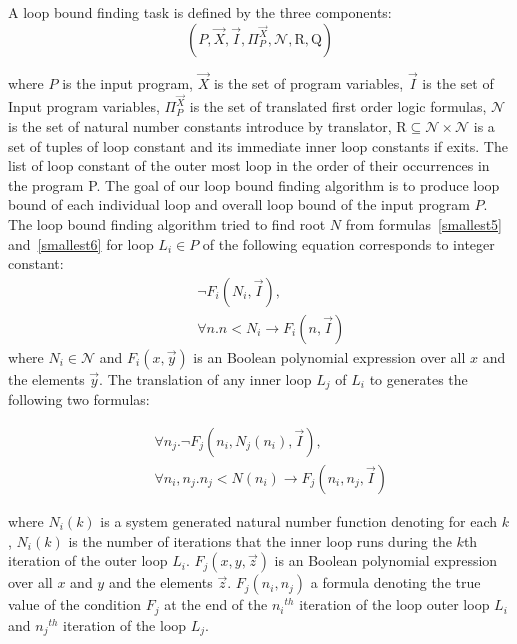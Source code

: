 \documentclass{article}
\begin{document}
A loop bound finding task is defined by the three components:
\[(P,\vec{X},\vec{I},\Pi_P^{\vec{X}},\mathcal{N},\mathrm{R},\mathrm{Q} )\]

where $P$ is the input program, $\vec{X}$ is the set of program variables,
$\vec{I}$ is the set of Input program variables, $\Pi_P^{\vec{X}}$ is the set of translated first order logic formulas, $\mathcal{N}$ is the set of natural number constants introduce by translator,  $\mathrm{R}\subseteq \mathcal{N} \times \mathcal{N}$ is a set of tuples of loop constant and its 
immediate inner loop constants if exits. The list of loop constant of the outer most loop in the order of their occurrences in the program P.
The goal of our loop bound finding algorithm is to produce loop bound of each individual loop and overall loop bound of the input program $P$. The loop bound finding algorithm tried to find root $N$ from formulas~\ref{smallest5} and~\ref{smallest6}  for loop $L_i\in P$ of the following equation corresponds to integer constant:
\begin{eqnarray}
&& \neg F_i(N_i,\vec{I}), \label{smallest7}\\
&& \forall n. n< N_i\rightarrow  F_i(n,\vec{I}) \label{smallest8}
\end{eqnarray}
where $N_i\in \mathcal{N}$ and $F_i(x,\vec{y})$ is an Boolean polynomial expression over all $x$ and the elements $\vec{y}$. The translation of any inner loop $L_j$ of $L_i$ to generates the following two formulas:

\begin{eqnarray}
&&  \forall n_j.\neg F_j(n_i,N_j(n_i),\vec{I}), \label{smallest1}\\
&& \forall n_i,n_j. n_j< N(n_i)\rightarrow  F_j(n_i,n_j,\vec{I}) \label{smallest2}
\end{eqnarray}

where $N_i(k)$ is a system generated natural number function denoting for each $k$, $N_i(k)$ is the number of iterations that the inner loop runs during the $k$th iteration of the outer loop $L_i$. $F_j(x, y,\vec{z})$ is an Boolean polynomial expression over all $x$ and $y$ and the elements $\vec{z}$. $F_j(n_i,n_j)$ a formula denoting the true value of the condition $F_j$ at the end of the ${n_i}^{th}$ iteration of the loop outer loop $L_i$ and ${n_j}^{th}$ iteration of the loop $L_j$.
\end{document}
